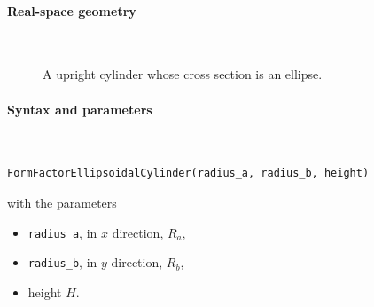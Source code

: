 \paragraph{Real-space geometry}\strut\\

\begin{figure}[H]
\hfill
{}
\hfill
{}
\hfill
{}
\hfill
\caption{A upright cylinder whose cross section is an ellipse.}
\end{figure}

\paragraph{Syntax and parameters}\strut\\[-2ex plus .2ex minus .2ex]
\begin{lstlisting}[language=python, style=eclipseboxed,numbers=none,nolol]
  FormFactorEllipsoidalCylinder(radius_a, radius_b, height)
\end{lstlisting}
with the parameters
\begin{itemize}
\item \texttt{radius\_a}, in $x$ direction, $R_a$,
\item \texttt{radius\_b}, in $y$ direction, $R_b$,
\item height $H$.
\end{itemize}


